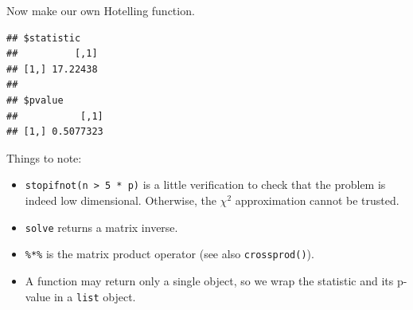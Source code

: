 \documentclass[]{book}
\newenvironment{Shaded}{\begin{snugshade}}{\end{snugshade}}
\newcommand{\ControlFlowTok}[1]{\textcolor[rgb]{0.13,0.29,0.53}{\textbf{#1}}}
\newcommand{\DataTypeTok}[1]{\textcolor[rgb]{0.13,0.29,0.53}{#1}}
\newcommand{\DecValTok}[1]{\textcolor[rgb]{0.00,0.00,0.81}{#1}}
\newcommand{\KeywordTok}[1]{\textcolor[rgb]{0.13,0.29,0.53}{\textbf{#1}}}
\newcommand{\NormalTok}[1]{#1}
\newcommand{\OperatorTok}[1]{\textcolor[rgb]{0.81,0.36,0.00}{\textbf{#1}}}
\newcommand{\OtherTok}[1]{\textcolor[rgb]{0.56,0.35,0.01}{#1}}
\newcommand{\StringTok}[1]{\textcolor[rgb]{0.31,0.60,0.02}{#1}}
\providecommand{\tightlist}{%
  \setlength{\itemsep}{0pt}\setlength{\parskip}{0pt}}
\theoremstyle{definition}
\theoremstyle{definition}
\theoremstyle{definition}
\theoremstyle{remark}
\begin{document}
Now make our own Hotelling function.

\begin{Shaded}
\end{Shaded}

\begin{verbatim}
## $statistic
##          [,1]
## [1,] 17.22438
## 
## $pvalue
##           [,1]
## [1,] 0.5077323
\end{verbatim}

Things to note:

\begin{itemize}
\tightlist
\item
  \texttt{stopifnot(n\ \textgreater{}\ 5\ *\ p)} is a little verification to check that the problem is indeed low dimensional. Otherwise, the \(\chi^2\) approximation cannot be trusted.
\item
  \texttt{solve} returns a matrix inverse.
\item
  \texttt{\%*\%} is the matrix product operator (see also \texttt{crossprod()}).
\item
  A function may return only a single object, so we wrap the statistic and its p-value in a \texttt{list} object.
\end{itemize}
\end{document}
